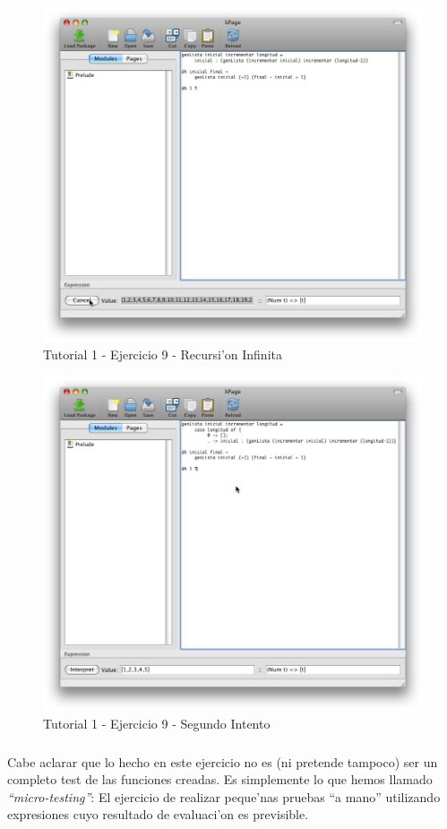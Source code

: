 \documentclass[a4paper]{article}
\begin{document}
\begin{figure}[hp]
	\begin{center}
        	\includegraphics[width=.9\textwidth]{pictures/tut1/07}
		\caption{Tutorial 1 - Ejercicio 9 - Recursi'on Infinita}
		\label{tut107}
	\end{center}
\end{figure}
\begin{figure}[hp]
	\begin{center}
        	\includegraphics[width=.9\textwidth]{pictures/tut1/08}
		\caption{Tutorial 1 - Ejercicio 9 - Segundo Intento}
		\label{tut108}
	\end{center}
\end{figure}
\subparagraph{}Cabe aclarar que lo hecho en este ejercicio no es (ni pretende tampoco) ser un completo test de las funciones creadas.  Es simplemente lo que hemos llamado \textsl{``micro-testing''}: El ejercicio de realizar peque'nas pruebas ``a mano'' utilizando expresiones cuyo resultado de evaluaci'on es previsible.
\end{document}
